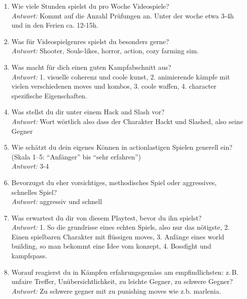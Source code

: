\documentclass[../Main.tex]{subfiles}
\begin{document}
\begin{enumerate}[label=\textbf{P\arabic*}, leftmargin=1.5cm, itemsep=0.8em]
    \item Wie viele Stunden spielst du pro Woche Videospiele? \\
    \textit{Antwort:} Kommt auf die Anzahl Prüfungen an. Unter der woche etwa 3-4h und in den Ferien ca. 12-15h.

    \item Was für Videospielgenres spielst du besonders gerne? \\
    \textit{Antwort:} Shooter, Souls-likes, horror, action, cozy farming sim.

    \item Was macht für dich einen guten Kampfabschnitt aus? \\
    \textit{Antwort:} 1. visuelle coherenz und coole kunst, 2. animierende kämpfe mit vielen verschiedenen moves und kombos, 3. coole waffen, 4. character spezifische Eigenschaften.

    \item Was stellst du dir unter einem Hack and Slash vor? \\
    \textit{Antwort:} Wort wörtlich also dass der Charakter Hackt und Slashed, also seine Gegner

    \item Wie schätzt du dein eigenes Können in actionlastigen Spielen generell ein? (Skala 1--5: \enquote{Anfänger} bis \enquote{sehr erfahren}) \\
    \textit{Antwort:} 3-4

    \item Bevorzugst du eher vorsichtiges, methodisches Spiel oder aggressives, schnelles Spiel? \\
    \textit{Antwort:} aggressiv und schnell

    \item Was erwartest du dir von diesem Playtest, bevor du ihn spielst? \\
    \textit{Antwort:} 1. So die grundrisse eines echten Spiels, also nur das nötigste, 2. Einen spielbaren Charakter mit flüssigen moves, 3. Anfänge eines world building, so man bekommt eine Idee vom konzept, 4. Bossfight und kampfspass.

    \item Worauf reagierst du in Kämpfen erfahrungsgemäss am empfindlichsten: z.\,B. unfaire Treffer, Unübersichtlichkeit, zu leichte Gegner, zu schwere Gegner? \\
    \textit{Antwort:} Zu schwere gegner mit zu punishing moves wie z.b. marlenia.
\end{enumerate}
\end{document}
